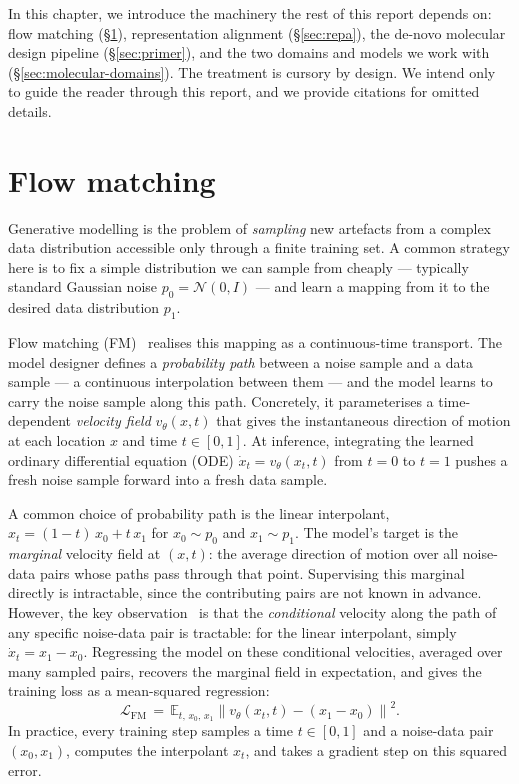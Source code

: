 \documentclass[12pt,a4paper,twoside]{report}
\begin{document}
In this chapter, we introduce the machinery the rest of this report depends on: flow matching (\S\ref{sec:flow-matching}), representation alignment (\S\ref{sec:repa}), the de-novo molecular design pipeline (\S\ref{sec:primer}), and the two domains and models we work with (\S\ref{sec:molecular-domains}). The treatment is cursory by design. We intend only to guide the reader through this report, and we provide citations for omitted details.

\section{Flow matching}
\label{sec:flow-matching}

Generative modelling is the problem of \emph{sampling} new artefacts from a complex data distribution accessible only through a finite training set. A common strategy here is to fix a simple distribution we can sample from cheaply --- typically standard Gaussian noise $p_0 = \mathcal{N}(0, I)$ --- and learn a mapping from it to the desired data distribution $p_1$.

Flow matching (FM)~\cite{FlowMatching} realises this mapping as a continuous-time transport. The model designer defines a \emph{probability path} between a noise sample and a data sample --- a continuous interpolation between them --- and the model learns to carry the noise sample along this path. Concretely, it parameterises a time-dependent \emph{velocity field} $v_\theta(x, t)$ that gives the instantaneous direction of motion at each location $x$ and time $t \in [0, 1]$. At inference, integrating the learned ordinary differential equation (ODE) $\dot{x}_t = v_\theta(x_t, t)$ from $t = 0$ to $t = 1$ pushes a fresh noise sample forward into a fresh data sample.

A common choice of probability path is the linear interpolant, $x_t = (1-t)\, x_0 + t\, x_1$ for $x_0 \sim p_0$ and $x_1 \sim p_1$. The model's target is the \emph{marginal} velocity field at $(x, t)$: the average direction of motion over all noise-data pairs whose paths pass through that point. Supervising this marginal directly is intractable, since the contributing pairs are not known in advance. However, the key observation~\cite{FlowMatching} is that the \emph{conditional} velocity along the path of any specific noise-data pair is tractable: for the linear interpolant, simply $\dot{x}_t = x_1 - x_0$. Regressing the model on these conditional velocities, averaged over many sampled pairs, recovers the marginal field in expectation, and gives the training loss as a mean-squared regression:
\[
  \mathcal{L}_{\text{FM}} \,=\, \mathbb{E}_{t,\, x_0,\, x_1} \left\| v_\theta(x_t, t) - (x_1 - x_0) \right\|^2.
\]
In practice, every training step samples a time $t \in [0,1]$ and a noise-data pair $(x_0, x_1)$, computes the interpolant $x_t$, and takes a gradient step on this squared error.
\end{document}

